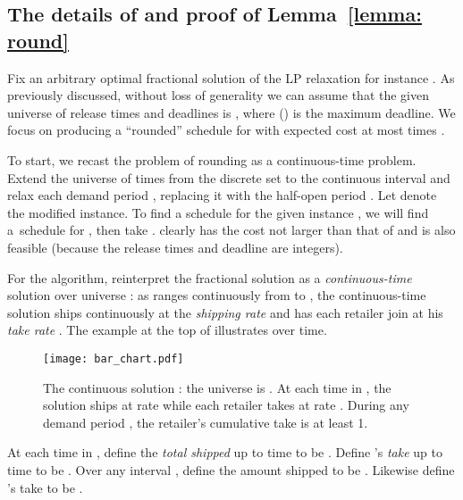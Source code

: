 \subsection{The details of \texorpdfstring{}{Round(p)} and 
proof of \texorpdfstring{Lemma~\ref{lemma: round}}{Lemma 1}}\label{sec: details}

Fix an arbitrary optimal fractional solution  of the LP relaxation for instance .
As previously discussed, without loss of generality we can assume that
the given universe  of release times and deadlines is ,
where  () is the maximum deadline.
We focus on producing a ``rounded'' schedule  for 
with expected cost at most  times
.


\newcommand{\rmo}{r\mbox{--}1}

To start, we recast the problem of rounding  as a continuous-time problem.
Extend the universe  of times
from the discrete set 
to the continuous interval 
and relax each demand period , 
replacing it with the half-open period .
Let  denote the modified instance.
To find a schedule  for the given instance ,
we will find a~schedule  for ,
then take .
 clearly has the cost not larger than that of 
and is also feasible (because the release times and deadline are integers).

For the algorithm, reinterpret the fractional solution  
as a {\em continuous-time} solution  over universe :
as  ranges continuously from  to ,
the continuous-time solution 
 ships continuously at the {\em shipping rate} 
and has each retailer  join at his {\em take rate} 
.
The example at the top of  illustrates  over time.



\begin{figure}[t]
  \centering
    \texttt{[image: bar\_chart.pdf]}
    \vspace*{-10pt}
    \caption{
      The continuous solution :
      the universe is .
      At each time  in ,
      the solution ships at rate 
      while each retailer  takes at rate .
      During any demand period , the retailer's cumulative take
      is at least 1.
    }
    \label{fig:bar_chart}
\end{figure}



At each time  in ,
define the {\em total shipped} up to time  to be
.
Define 's {\em take} up to time  to be
.
Over any interval , define the amount shipped to be .
Likewise define 's take to be .




